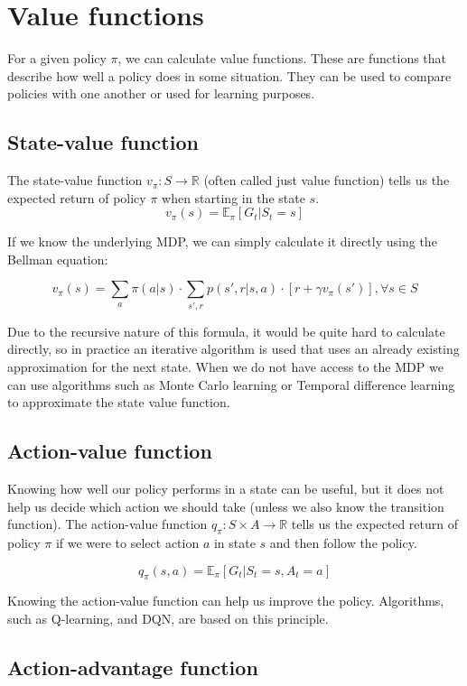 \documentclass[
  digital,     %
  oneside,     %
  nosansbold,  %
  nocolorbold, %
  lof,         %
  lot,         %
]{fithesis4}
\begin{document}
\section{Value functions}

For a given policy $\pi$, we can calculate value functions. These are functions that describe how well a policy does in some situation. They can be used to compare policies with one another or used for learning purposes.

\subsection{State-value function}
The state-value function $v_\pi\colon S\to \mathbb{R}$ (often called just value function) tells us the expected return of policy $\pi$ when starting in the state $s$.
\[
v_\pi(s) = \mathbb{E}_\pi [G_t|S_t=s]
\]

If we know the underlying MDP, we can simply calculate it directly using the Bellman equation:

\[
v_\pi(s) = \sum_a \pi(a|s) \cdot \sum_{s',r} p(s',r|s,a)\cdot[r+\gamma v_\pi(s')], \forall s \in S
\]

Due to the recursive nature of this formula, it would be quite hard to calculate directly, so in practice an iterative algorithm is used that uses an already existing approximation for the next state. When we do not have access to the MDP we can use algorithms such as Monte Carlo learning or Temporal difference learning to approximate the state value function.

\subsection{Action-value function}

Knowing how well our policy performs in a state can be useful, but it does not help us decide which action we should take (unless we also know the transition function). The action-value function $q_\pi\colon S \times A \to \mathbb{R}$ tells us the expected return of policy $\pi$ if we were to select action $a$ in state $s$ and then follow the policy.

\[
q_\pi(s,a) = \mathbb{E}_\pi [G_t|S_t=s,A_t=a]
\]

Knowing the action-value function can help us improve the policy. Algorithms, such as Q-learning, and DQN, are based on this principle.

\subsection{Action-advantage function}
\end{document}
